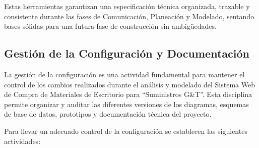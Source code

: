 Estas herramientas garantizan una especificación técnica organizada, trazable y consistente durante las fases de Comunicación, Planeación y Modelado, sentando bases sólidas para una futura fase de construcción sin ambigüedades.

\subsection{Gestión de la Configuración y Documentación}

La gestión de la configuración es una actividad fundamental para mantener el control de los cambios realizados durante el análisis y modelado del Sistema Web de Compra de Materiales de Escritorio para ``Suministros G\&T''. Esta disciplina permite organizar y auditar las diferentes versiones de los diagramas, esquemas de base de datos, prototipos y documentación técnica del proyecto.

Para llevar un adecuado control de la configuración se establecen las siguientes actividades:

